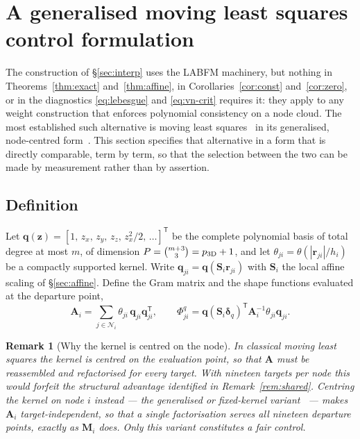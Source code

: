 \documentclass[11pt,a4paper]{article}
\newcommand{\rji}{\bm{r}_{ji}}
\newtheorem{remark}{Remark}
\begin{document}
\section{A generalised moving least squares control formulation}
\label{sec:mls}

The construction of \S\ref{sec:interp} uses the LABFM machinery, but nothing in
Theorems~\ref{thm:exact} and~\ref{thm:affine}, in Corollaries~\ref{cor:const}
and~\ref{cor:zero}, or in the diagnostics \eqref{eq:lebesgue} and \eqref{eq:vn-crit}
requires it: they apply to any weight construction that enforces polynomial
consistency on a node cloud. The most established such alternative is moving least
squares~\cite{Lancaster1981} in its generalised, node-centred
form~\cite{Mirzaei2012,Trask2016}. This section specifies that alternative in a form
that is directly comparable, term by term, so that the selection between the two can
be made by measurement rather than by assertion.

\subsection{Definition}

Let $\bm q(\bm z)=[1,\,z_x,\,z_y,\,z_z,\,z_x^2/2,\,\dots]^{\mathsf T}$ be the complete
polynomial basis of total degree at most $m$, of dimension
$P=\binom{m+3}{3}=p_{\rm 3D}+1$, and let $\theta_{ji}=\theta(|\rji|/h_i)$ be a
compactly supported kernel. Write $\bm q_{ji}=\bm q(\bm S_i\rji)$ with $\bm S_i$ the
local affine scaling of \S\ref{sec:affine}. Define the Gram matrix and the shape
functions evaluated at the departure point,
\begin{equation}
\bm A_i=\sum_{j\in\mathcal N_i}\theta_{ji}\,\bm q_{ji}\bm q_{ji}^{\mathsf T},
\qquad
\Phi^{q}_{ji}=\bm q(\bm S_i\bm\delta_q)^{\mathsf T}\bm A_i^{-1}\theta_{ji}\bm q_{ji}.
\label{eq:mls}
\end{equation}

\begin{remark}[Why the kernel is centred on the node]
In classical moving least squares the kernel is centred on the \emph{evaluation}
point, so that $\bm A$ must be reassembled and refactorised for every target. With
nineteen targets per node this would forfeit the structural advantage identified in
Remark~\ref{rem:shared}. Centring the kernel on node $i$ instead --- the generalised
or fixed-kernel variant~\cite{Mirzaei2012,Trask2016} --- makes $\bm A_i$
target-independent, so that a single factorisation serves all nineteen departure
points, exactly as $\bm M_i$ does. Only this variant constitutes a fair control.
\end{remark}
\end{document}
